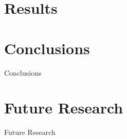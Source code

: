 \documentclass[pdf]{beamer}
\begin{document}
\section{Results}
\begin{frame}

\end{frame}

\section{Conclusions}
\begin{frame}{Conclusions}

\end{frame}

\section{Future Research}
\begin{frame}{Future Research}

\end{frame}
\end{document}
